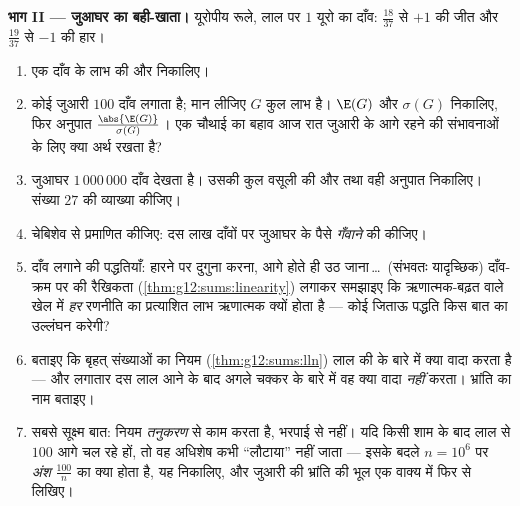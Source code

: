 \begin{problem}
\medskip
\noindent\textbf{भाग II --- जुआघर का बही-खाता।}
यूरोपीय रूले, लाल पर $1$ यूरो का दाँव:  $\frac{18}{37}$ से $+1$ की जीत और
 $\frac{19}{37}$ से $-1$ की हार।
\begin{enumerate}[resume]
  \item एक दाँव के लाभ की  और  निकालिए।
  \item कोई जुआरी $100$  दाँव लगाता है; मान लीजिए $G$ कुल लाभ है।
        $\E(G)$ और $\sigma(G)$ निकालिए, फिर अनुपात $\frac{\abs{\E(G)}}{\sigma(G)}$। एक चौथाई  का
        बहाव आज रात जुआरी के आगे रहने की संभावनाओं के लिए क्या अर्थ रखता है?
  \item जुआघर $1\,000\,000$ दाँव देखता है। उसकी कुल वसूली की  और  तथा वही अनुपात निकालिए। संख्या $27$ की व्याख्या कीजिए।
  \item चेबिशेव से प्रमाणित कीजिए: दस लाख दाँवों पर जुआघर के पैसे
        \emph{गँवाने} की   कीजिए।
  \item दाँव लगाने की पद्धतियाँ: हारने पर दुगुना करना, आगे होते ही उठ
        जाना\,\dots\ (संभवतः यादृच्छिक) दाँव-क्रम पर  की रैखिकता
        (\cref{thm:g12:sums:linearity}) लगाकर समझाइए कि ऋणात्मक-बढ़त वाले खेल में \emph{हर} रणनीति
        का प्रत्याशित लाभ ऋणात्मक क्यों होता है --- कोई जिताऊ पद्धति किस
        बात का उल्लंघन करेगी?
  \item बताइए कि बृहत् संख्याओं का नियम (\cref{thm:g12:sums:lln}) लाल की  के
        बारे में क्या वादा करता है --- और लगातार दस लाल आने के बाद अगले
        चक्कर के बारे में वह क्या वादा \emph{नहीं} करता। भ्रांति का नाम
        बताइए।
  \item सबसे सूक्ष्म बात: नियम \emph{तनुकरण} से काम करता है, भरपाई से नहीं।
        यदि किसी शाम के बाद लाल  से $100$ आगे चल रहे हों, तो वह
        अधिशेष कभी ``लौटाया'' नहीं जाता --- इसके बदले $n = 10^6$ पर \emph{अंश}
        $\frac{100}{n}$ का क्या होता है, यह निकालिए, और जुआरी की भ्रांति की भूल एक
        वाक्य में फिर से लिखिए।
\end{enumerate}


\end{problem}
